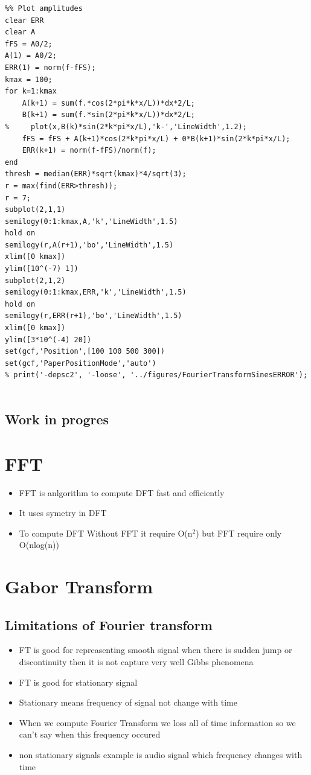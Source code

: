 \documentclass[11pt]{article}
\begin{document}
\begin{verbatim}
%% Plot amplitudes
clear ERR
clear A
fFS = A0/2;
A(1) = A0/2;
ERR(1) = norm(f-fFS);
kmax = 100;
for k=1:kmax
    A(k+1) = sum(f.*cos(2*pi*k*x/L))*dx*2/L;
    B(k+1) = sum(f.*sin(2*pi*k*x/L))*dx*2/L;
%     plot(x,B(k)*sin(2*k*pi*x/L),'k-','LineWidth',1.2);
    fFS = fFS + A(k+1)*cos(2*k*pi*x/L) + 0*B(k+1)*sin(2*k*pi*x/L);
    ERR(k+1) = norm(f-fFS)/norm(f);
end
thresh = median(ERR)*sqrt(kmax)*4/sqrt(3);
r = max(find(ERR>thresh));
r = 7;
subplot(2,1,1)
semilogy(0:1:kmax,A,'k','LineWidth',1.5)
hold on
semilogy(r,A(r+1),'bo','LineWidth',1.5)
xlim([0 kmax])
ylim([10^(-7) 1])
subplot(2,1,2)
semilogy(0:1:kmax,ERR,'k','LineWidth',1.5)
hold on
semilogy(r,ERR(r+1),'bo','LineWidth',1.5)
xlim([0 kmax])
ylim([3*10^(-4) 20])
set(gcf,'Position',[100 100 500 300])
set(gcf,'PaperPositionMode','auto')
% print('-depsc2', '-loose', '../figures/FourierTransformSinesERROR');


\end{verbatim}
\subsection{Work in progres}
\label{sec:orgd47e096}
\section{FFT}
\label{sec:org6d8052f}
\begin{itemize}
\item FFT is anlgorithm to compute DFT fast and efficiently
\item It uses symetry in DFT
\item To compute DFT Without FFT it require O(n\(^{\text{2}}\)) but FFT require only O(nlog(n))
\end{itemize}
\subsection{}
\label{sec:orgbf37007}
\section{Gabor Transform}
\label{sec:orgf83598e}
\subsection{Limitations of Fourier transform}
\label{sec:org036d8d9}
\begin{itemize}
\item FT is good for repreasenting smooth signal when there is sudden jump or discontinuity then it is not capture very well Gibbs phenomena
\item FT is good for stationary signal
\item Stationary means frequency of signal not change with time
\item When we compute Fourier Transform we loss all of time information so we can't say when this frequency occured
\item non stationary signals example is audio signal which frequency changes with time
\end{itemize}
\end{document}
